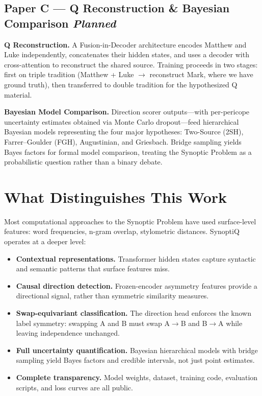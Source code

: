 \documentclass[11pt,letterpaper]{article}
\begin{document}
\subsection{Paper C --- Q Reconstruction \& Bayesian Comparison \hfill \textit{Planned}}

\textbf{Q Reconstruction.}  A Fusion-in-Decoder architecture encodes
Matthew and Luke independently, concatenates their hidden states, and
uses a decoder with cross-attention to reconstruct the shared source.
Training proceeds in two stages: first on triple tradition (Matthew +
Luke $\rightarrow$ reconstruct Mark, where we have ground truth), then
transferred to double tradition for the hypothesized Q material.

\textbf{Bayesian Model Comparison.}  Direction scorer outputs---with
per-pericope uncertainty estimates obtained via Monte Carlo
dropout---feed hierarchical Bayesian models representing the four major
hypotheses: Two-Source (2SH), Farrer--Goulder (FGH), Augustinian, and
Griesbach.  Bridge sampling yields Bayes factors for formal model
comparison, treating the Synoptic Problem as a probabilistic question
rather than a binary debate.

\section{What Distinguishes This Work}

Most computational approaches to the Synoptic Problem have used
surface-level features: word frequencies, n-gram overlap, stylometric
distances.  SynoptiQ operates at a deeper level:

\begin{itemize}
\item \textbf{Contextual representations.}  Transformer hidden states
  capture syntactic and semantic patterns that surface features miss.
\item \textbf{Causal direction detection.}  Frozen-encoder asymmetry
  features provide a directional signal, rather than symmetric similarity
  measures.
\item \textbf{Swap-equivariant classification.}  The direction head
  enforces the known label symmetry: swapping A and B must swap
  A$\rightarrow$B and B$\rightarrow$A while leaving independence unchanged.
\item \textbf{Full uncertainty quantification.}  Bayesian hierarchical
  models with bridge sampling yield Bayes factors and credible intervals,
  not just point estimates.
\item \textbf{Complete transparency.}  Model weights, dataset, training
  code, evaluation scripts, and loss curves are all public.
\end{itemize}
\end{document}
